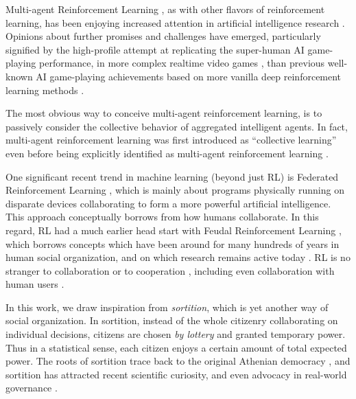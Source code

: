 \documentclass[twoside]{article}
\begin{document}
Multi-agent Reinforcement Learning \cite{collective-1993,multiagent-1994-most-cited,multiagent-2021-most-cited}, as with other flavors of reinforcement learning, has been enjoying increased attention in artificial intelligence research \cite{unified-multiagent}.
Opinions about further promises and challenges have emerged, particularly signified by the
high-profile attempt at replicating the super-human AI game-playing performance, in more complex realtime video games \cite{nature-starcraft},
than previous well-known AI game-playing achievements based on more vanilla deep reinforcement learning methods \cite{nature-ATARI,nature-go-2}.

The most obvious way to conceive multi-agent reinforcement learning, is to passively consider the collective behavior of aggregated intelligent agents.
In fact, multi-agent reinforcement learning was first introduced as ``collective learning'' \cite{collective-1993} even before being explicitly identified as multi-agent reinforcement learning \cite{multiagent-1994-most-cited}.


One significant recent trend in machine learning (beyond just RL)
is Federated Reinforcement Learning \cite{federated-learning-2021},
which is mainly about programs physically running on disparate devices collaborating to form a more powerful artificial intelligence. This approach conceptually borrows from how humans collaborate.
In this regard, RL had a much earlier head start with
Feudal Reinforcement Learning \cite{feudal-1992}, which borrows concepts which have been around for many hundreds of years in human social organization, and on which research remains active today \cite{Johnson2020FeudalSH}.
RL is no stranger to
collaboration \cite{Kok2006CollaborativeMR} or to
cooperation \cite{Qiu2021RMIXLR}, including even collaboration with
human users \cite{collab-other}.

In this work, we draw inspiration from \emph{sortition}, which is yet another way of social organization. In sortition, instead of the whole citizenry collaborating on individual
decisions, citizens are chosen \emph{by lottery} and granted temporary power. Thus in a
statistical sense, each citizen enjoys a certain amount of total expected power.
The roots of sortition trace back to the original Athenian democracy \cite{sortition-ancient},
and sortition has attracted recent scientific curiosity, and even advocacy in real-world governance \cite{nature-sortition,Sintomer2018FromDT,sortition-2013}.
\end{document}
